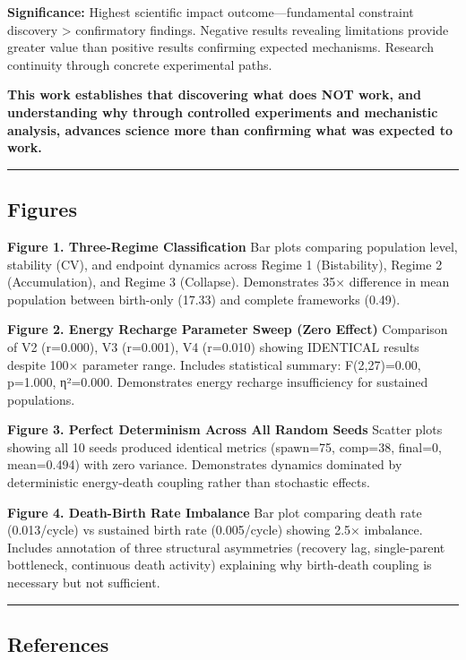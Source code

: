 \documentclass[
]{article}
\begin{document}
\textbf{Significance:} Highest scientific impact outcome---fundamental
constraint discovery \textgreater{} confirmatory findings. Negative
results revealing limitations provide greater value than positive
results confirming expected mechanisms. Research continuity through
concrete experimental paths.

\textbf{This work establishes that discovering what does NOT work, and
understanding why through controlled experiments and mechanistic
analysis, advances science more than confirming what was expected to
work.}

\begin{center}\rule{0.5\linewidth}{0.5pt}\end{center}

\subsection{Figures}\label{figures}

\textbf{Figure 1. Three-Regime Classification} Bar plots comparing
population level, stability (CV), and endpoint dynamics across Regime 1
(Bistability), Regime 2 (Accumulation), and Regime 3 (Collapse).
Demonstrates 35× difference in mean population between birth-only
(17.33) and complete frameworks (0.49).

\textbf{Figure 2. Energy Recharge Parameter Sweep (Zero Effect)}
Comparison of V2 (r=0.000), V3 (r=0.001), V4 (r=0.010) showing IDENTICAL
results despite 100× parameter range. Includes statistical summary:
F(2,27)=0.00, p=1.000, η²=0.000. Demonstrates energy recharge
insufficiency for sustained populations.

\textbf{Figure 3. Perfect Determinism Across All Random Seeds} Scatter
plots showing all 10 seeds produced identical metrics (spawn=75,
comp=38, final=0, mean=0.494) with zero variance. Demonstrates dynamics
dominated by deterministic energy-death coupling rather than stochastic
effects.

\textbf{Figure 4. Death-Birth Rate Imbalance} Bar plot comparing death
rate (0.013/cycle) vs sustained birth rate (0.005/cycle) showing 2.5×
imbalance. Includes annotation of three structural asymmetries (recovery
lag, single-parent bottleneck, continuous death activity) explaining why
birth-death coupling is necessary but not sufficient.

\begin{center}\rule{0.5\linewidth}{0.5pt}\end{center}

\subsection{References}\label{references}
\end{document}
